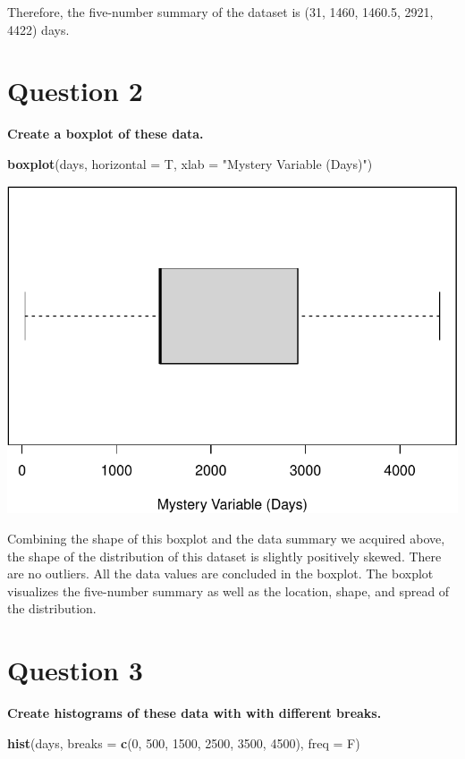 \documentclass[
]{book}
\newenvironment{Shaded}{\begin{snugshade}}{\end{snugshade}}
\newcommand{\AttributeTok}[1]{\textcolor[rgb]{0.13,0.29,0.53}{#1}}
\newcommand{\DecValTok}[1]{\textcolor[rgb]{0.00,0.00,0.81}{#1}}
\newcommand{\FunctionTok}[1]{\textcolor[rgb]{0.13,0.29,0.53}{\textbf{#1}}}
\newcommand{\NormalTok}[1]{#1}
\newcommand{\StringTok}[1]{\textcolor[rgb]{0.31,0.60,0.02}{#1}}
\begin{document}
Therefore, the five-number summary of the dataset is (31, 1460, 1460.5, 2921, 4422) days.

\section{Question 2}\label{question-2}

\textbf{Create a boxplot of these data.}

\begin{Shaded}
\begin{Highlighting}[]
\FunctionTok{boxplot}\NormalTok{(days, }\AttributeTok{horizontal =}\NormalTok{ T, }\AttributeTok{xlab =} \StringTok{"Mystery Variable (Days)"}\NormalTok{)}
\end{Highlighting}
\end{Shaded}

\begin{center}\includegraphics[width=0.8\linewidth]{_main_files/figure-latex/unnamed-chunk-2-1} \end{center}

Combining the shape of this boxplot and the data summary we acquired above, the shape of the distribution of this dataset is slightly positively skewed. There are no outliers. All the data values are concluded in the boxplot. The boxplot visualizes the five-number summary as well as the location, shape, and spread of the distribution.

\section{Question 3}\label{question-3}

\textbf{Create histograms of these data with with different breaks.}

\begin{Shaded}
\begin{Highlighting}[]
\FunctionTok{hist}\NormalTok{(days, }\AttributeTok{breaks =} \FunctionTok{c}\NormalTok{(}\DecValTok{0}\NormalTok{, }\DecValTok{500}\NormalTok{, }\DecValTok{1500}\NormalTok{, }\DecValTok{2500}\NormalTok{, }\DecValTok{3500}\NormalTok{, }\DecValTok{4500}\NormalTok{), }\AttributeTok{freq =}\NormalTok{ F)}
\end{Highlighting}
\end{Shaded}
\end{document}
